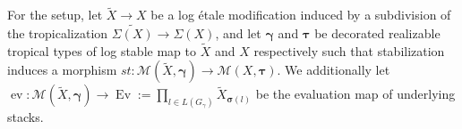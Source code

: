 \documentclass[12pt, oneside]{amsart}   	%
\newcounter{thm}
\newtheorem{theorem}[thm]{Theorem}
\newcommand{\ev}{\operatorname{ev}}
\newcommand{\Ev}{\operatorname{Ev}}
\numberwithin{equation}{section}
\numberwithin{thm}{section}
\numberwithin{figure}{section}
\begin{document}
%
%



For the setup, let $\widetilde{X} \rightarrow X$ be a log \'etale modification induced by a subdivision of the tropicalization $\widetilde{\Sigma(X)} \rightarrow \Sigma(X)$, and let $\pmb\gamma$ and $\pmb\tau$ be decorated realizable tropical types of log stable map to $\widetilde{X}$ and $X$ respectively such that stabilization induces a morphism $st: \mathscr{M}(\widetilde{X},\pmb\gamma) \rightarrow \mathscr{M}(X,\pmb\tau)$. We additionally let $\ev: \mathscr{M}(\widetilde{X},\pmb\gamma) \rightarrow \Ev:=\prod_{l \in L(G_{\gamma})} \widetilde{X}_{\pmb\sigma(l)}$ be the evaluation map of underlying stacks.




%
%
%
%
%
\end{document}
